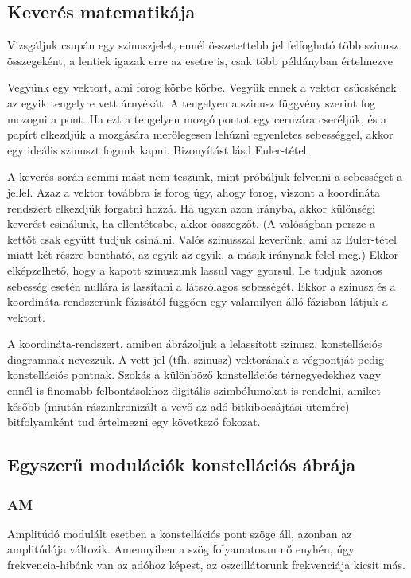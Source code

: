 \documentclass[12pt,a4paper]{article}
\begin{document}
\subsection{Keverés matematikája}
Vizsgáljuk csupán egy szinuszjelet, ennél összetettebb jel felfogható több szinusz összegeként, a lentiek igazak erre az esetre is, csak több példányban értelmezve
\par
Vegyünk egy vektort, ami forog körbe körbe. Vegyük ennek a vektor csücskének az egyik tengelyre vett árnyékát. A tengelyen a szinusz függvény szerint fog mozogni a pont. Ha ezt a tengelyen mozgó pontot egy ceruzára cseréljük, és a papírt elkezdjük a mozgására merőlegesen lehúzni egyenletes sebességgel, akkor egy ideális szinuszt fogunk kapni. Bizonyítást lásd Euler-tétel.
\par
A keverés során semmi mást nem teszünk, mint próbáljuk felvenni a sebességet a jellel. Azaz a vektor továbbra is forog úgy, ahogy forog, viszont a koordináta rendszert elkezdjük forgatni hozzá. Ha ugyan azon irányba, akkor különségi keverést csinálunk, ha ellentétesbe, akkor összegzőt. (A valóságban persze a kettőt csak együtt tudjuk csinálni. Valós szinusszal keverünk, ami az Euler-tétel miatt két részre bontható, az egyik az egyik, a másik iránynak felel meg.) Ekkor elképzelhető, hogy a kapott szinuszunk lassul vagy gyorsul. Le tudjuk azonos sebesség esetén nullára is lassítani a látszólagos sebességét. Ekkor a szinusz és a koordináta-rendszerünk fázisától függően egy valamilyen álló fázisban látjuk a vektort.
\par
A koordináta-rendszert, amiben ábrázoljuk a lelassított szinusz, konstellációs diagramnak nevezzük. A vett jel (tfh. szinusz) vektorának a végpontját pedig konstellációs pontnak. Szokás a különböző konstellációs térnegyedekhez vagy ennél is finomabb felbontásokhoz digitális szimbólumokat is rendelni, amiket később (miután rászinkronizált a vevő az adó bitkibocsájtási ütemére) bitfolyamként tud értelmezni egy következő fokozat.

\subsection{Egyszerű modulációk konstellációs ábrája}
\subsubsection{AM}
Amplitúdó modulált esetben a konstellációs pont szöge áll, azonban az amplitúdója változik. Amennyiben a szög folyamatosan nő enyhén, úgy frekvencia-hibánk van az adóhoz képest, az oszcillátorunk frekvenciája kicsit más.
\end{document}
